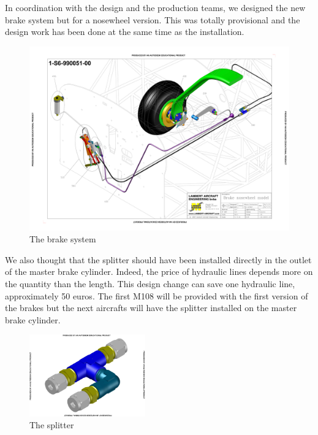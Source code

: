 \documentclass[11pt,a4paper]{article}
\begin{document}
\bigskip

In coordination with the design and the production teams, we designed the new brake system but for a nosewheel version. This was totally provisional and the design work has been done at the same time as the installation.

\begin{figure}[ht!]
	\begin{center}
		\includegraphics[width=15cm,trim = 1.5cm 2.5cm 1.5cm 2.5cm, clip]{pics/PIC019.pdf}
		\caption{The brake system}
		\label{fig:PIC019}
	\end{center}
\end{figure}

We also thought that the splitter should have been installed directly in the outlet of the master brake cylinder. Indeed, the price of hydraulic lines depends more on the quantity than the length. This design change can save one hydraulic line, approximately 50 euros. The first M108 will be provided with the first version of the brakes but the next aircrafts will have the splitter installed on the master brake cylinder.
\begin{figure}[ht!]
	\begin{center}
		\includegraphics[width=5cm,trim = 1cm 1cm 1cm 1cm, clip]{pics/PIC020.pdf}
		\caption{The splitter}
		\label{fig:PIC020}
	\end{center}
\end{figure}
\end{document}
